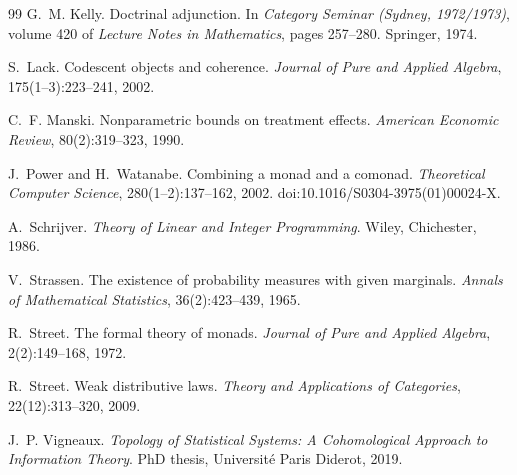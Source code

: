 \documentclass[11pt]{article}
\theoremstyle{definition}
\theoremstyle{remark}
\begin{document}
\begin{thebibliography}{99}
G.~M. Kelly.
\newblock Doctrinal adjunction.
\newblock In \emph{Category Seminar (Sydney, 1972/1973)}, volume 420 of \emph{Lecture Notes in
  Mathematics}, pages 257--280. Springer, 1974.

S.~Lack.
\newblock Codescent objects and coherence.
\newblock \emph{Journal of Pure and Applied Algebra}, 175(1--3):223--241, 2002.

C.~F. Manski.
\newblock Nonparametric bounds on treatment effects.
\newblock \emph{American Economic Review}, 80(2):319--323, 1990.

J.~Power and H.~Watanabe.
\newblock Combining a monad and a comonad.
\newblock \emph{Theoretical Computer Science}, 280(1--2):137--162, 2002.
\newblock doi:10.1016/S0304-3975(01)00024-X.

A.~Schrijver.
\newblock \emph{Theory of Linear and Integer Programming}.
\newblock Wiley, Chichester, 1986.

V.~Strassen.
\newblock The existence of probability measures with given marginals.
\newblock \emph{Annals of Mathematical Statistics}, 36(2):423--439, 1965.

R.~Street.
\newblock The formal theory of monads.
\newblock \emph{Journal of Pure and Applied Algebra}, 2(2):149--168, 1972.

R.~Street.
\newblock Weak distributive laws.
\newblock \emph{Theory and Applications of Categories}, 22(12):313--320, 2009.

J.~P. Vigneaux.
\newblock \emph{Topology of Statistical Systems: A Cohomological Approach to Information Theory}.
\newblock PhD thesis, Universit\'e Paris Diderot, 2019.

\end{thebibliography}
\end{document}
